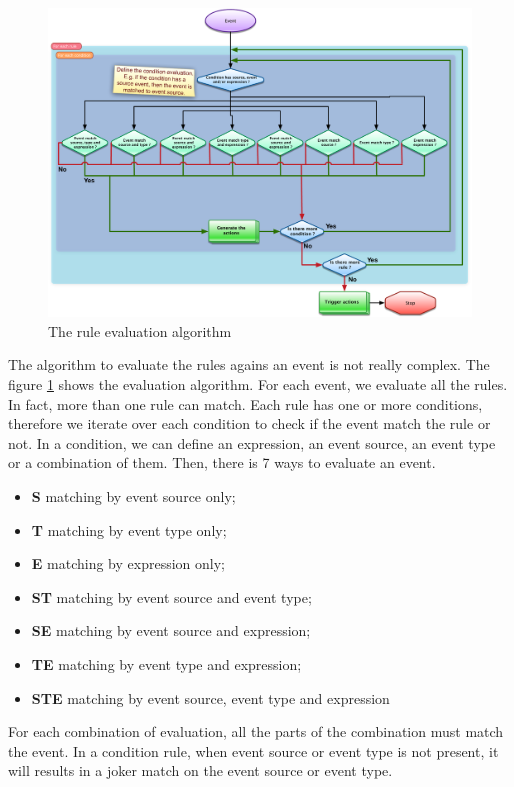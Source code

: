 \begin{figure}
\centering
\includegraphics[width=.8\textwidth]{figures/rules-evaluation}
\caption{The rule evaluation algorithm}
\label{fig:rule-eval}
\end{figure}

The algorithm to evaluate the rules agains an event is not really complex. The figure \ref{fig:rule-eval} shows the evaluation algorithm. For each event, we evaluate all the rules. In fact, more than one rule can match. Each rule has one or more conditions, therefore we iterate over each condition to check if the event match the rule or not. In a condition, we can define an expression, an event source, an event type or a combination of them. Then, there is 7 ways to evaluate an event.

\begin{itemize}
\item \textbf{S} matching by event source only;
\item \textbf{T} matching by event type only;
\item \textbf{E} matching by expression only;
\item \textbf{ST} matching by event source and event type;
\item \textbf{SE} matching by event source and expression;
\item \textbf{TE} matching by event type and expression;
\item \textbf{STE} matching by event source, event type and expression
\end{itemize}

For each combination of evaluation, all the parts of the combination must match the event. In a condition rule, when event source or event type is not present, it will results in a joker match on the event source or event type.

